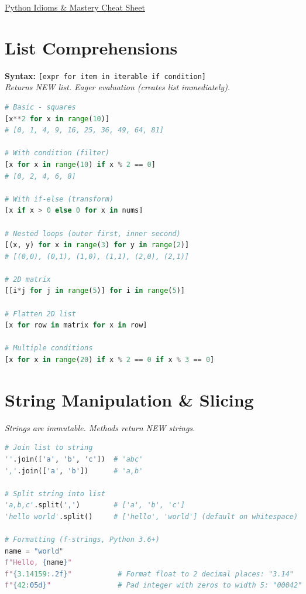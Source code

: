 \documentclass[8pt,landscape]{article}
\begin{document}
\raggedright
\scriptsize
\begin{multicols}{3}

\setlength{\premulticols}{1pt}
\setlength{\postmulticols}{1pt}
\setlength{\multicolsep}{1pt}
\setlength{\columnsep}{2pt}

\begin{center}
     \Large{\underline{Python Idioms \& Mastery Cheat Sheet}} \\
\end{center}

\section*{List Comprehensions}
\textbf{Syntax:} \lstinline|[expr for item in iterable if condition]| \\
\textit{Returns NEW list. Eager evaluation (creates list immediately).}

\begin{lstlisting}[language=Python]
# Basic - squares
[x**2 for x in range(10)]
# [0, 1, 4, 9, 16, 25, 36, 49, 64, 81]

# With condition (filter)
[x for x in range(10) if x % 2 == 0]
# [0, 2, 4, 6, 8]

# With if-else (transform)
[x if x > 0 else 0 for x in nums]

# Nested loops (outer first, inner second)
[(x, y) for x in range(3) for y in range(2)]
# [(0,0), (0,1), (1,0), (1,1), (2,0), (2,1)]

# 2D matrix
[[i*j for j in range(5)] for i in range(5)]

# Flatten 2D list
[x for row in matrix for x in row]

# Multiple conditions
[x for x in range(20) if x % 2 == 0 if x % 3 == 0]
\end{lstlisting}

\section*{String Manipulation \& Slicing}
\textit{Strings are immutable. Methods return NEW strings.}
\begin{lstlisting}[language=Python]
# Join list to string
''.join(['a', 'b', 'c'])  # 'abc'
','.join(['a', 'b'])      # 'a,b'

# Split string into list
'a,b,c'.split(',')        # ['a', 'b', 'c']
'hello world'.split()     # ['hello', 'world'] (default on whitespace)

# Formatting (f-strings, Python 3.6+)
name = "world"
f"Hello, {name}"
f"{3.14159:.2f}"           # Format float to 2 decimal places: "3.14"
f"{42:05d}"                # Pad integer with zeros to width 5: "00042"


\end{lstlisting}
\end{multicols}
\end{document}
